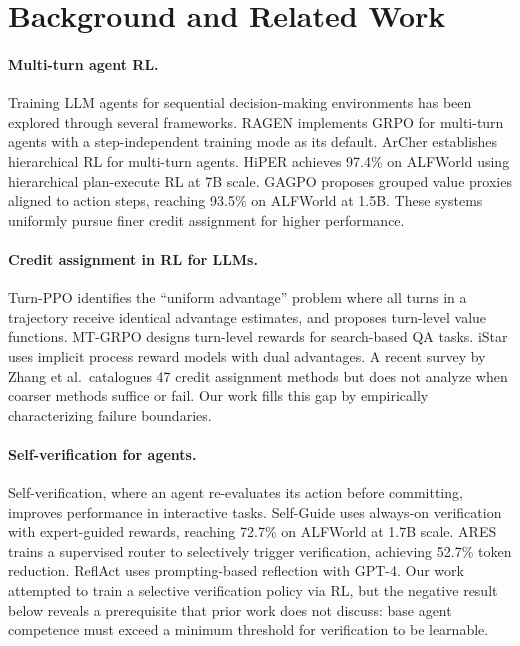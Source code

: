 \documentclass[11pt]{article}
\begin{document}
\section{Background and Related Work}

\paragraph{Multi-turn agent RL.}
Training LLM agents for sequential decision-making environments has been explored through several frameworks.
RAGEN implements GRPO for multi-turn agents with a step-independent training mode as its default.
ArCher establishes hierarchical RL for multi-turn agents.
HiPER achieves 97.4\% on ALFWorld using hierarchical plan-execute RL at 7B scale.
GAGPO proposes grouped value proxies aligned to action steps, reaching 93.5\% on ALFWorld at 1.5B.
These systems uniformly pursue finer credit assignment for higher performance.

\paragraph{Credit assignment in RL for LLMs.}
Turn-PPO identifies the ``uniform advantage'' problem where all turns in a trajectory receive identical advantage estimates, and proposes turn-level value functions.
MT-GRPO designs turn-level rewards for search-based QA tasks.
iStar uses implicit process reward models with dual advantages.
A recent survey by Zhang et al.\ catalogues 47 credit assignment methods but does not analyze when coarser methods suffice or fail.
Our work fills this gap by empirically characterizing failure boundaries.

\paragraph{Self-verification for agents.}
Self-verification, where an agent re-evaluates its action before committing, improves performance in interactive tasks.
Self-Guide uses always-on verification with expert-guided rewards, reaching 72.7\% on ALFWorld at 1.7B scale.
ARES trains a supervised router to selectively trigger verification, achieving 52.7\% token reduction.
ReflAct uses prompting-based reflection with GPT-4.
Our work attempted to train a selective verification policy via RL, but the negative result below reveals a prerequisite that prior work does not discuss: base agent competence must exceed a minimum threshold for verification to be learnable.
\end{document}
